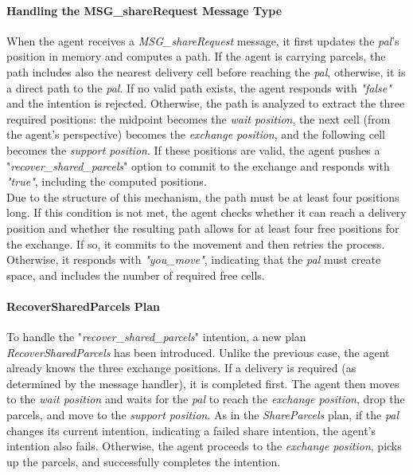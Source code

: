                 
                \paragraph{Handling the MSG\_shareRequest Message Type}
                    When the agent receives a \textit{MSG\_shareRequest} message, it first updates the \textit{pal}'s position in memory and computes a path. If the agent is carrying parcels, the path includes also the nearest delivery cell before reaching the \textit{pal}, otherwise, it is a direct path to the \textit{pal}. If no valid path exists, the agent responds with \textit{"false"} and the intention is rejected. Otherwise, the path is analyzed to extract the three required positions: the midpoint becomes the \textit{wait position}, the next cell (from the agent's perspective) becomes the \textit{exchange position}, and the following cell becomes the \textit{support position}. If these positions are valid, the agent pushes a "\textit{recover\_shared\_parcels}" option to commit to the exchange and responds with \textit{"true"}, including the computed positions.
                    \medskip\\
                    Due to the structure of this mechanism, the path must be at least four positions long. If this condition is not met, the agent checks whether it can reach a delivery position and whether the resulting path allows for at least four free positions for the exchange. If so, it commits to the movement and then retries the process. Otherwise, it responds with \textit{"you\_move"}, indicating that the \textit{pal} must create space, and includes the number of required free cells.
                    
                \paragraph{RecoverSharedParcels Plan}
                    To handle the "\textit{recover\_shared\_parcels}" intention, a new plan \textit{RecoverSharedParcels} has been introduced. Unlike the previous case, the agent already knows the three exchange positions. If a delivery is required (as determined by the message handler), it is completed first. The agent then moves to the \textit{wait position} and waits for the \textit{pal} to reach the \textit{exchange position}, drop the parcels, and move to the \textit{support position}. As in the \textit{ShareParcels} plan, if the \textit{pal} changes its current intention, indicating a failed share intention, the agent's intention also fails. Otherwise, the agent proceeds to the \textit{exchange position}, picks up the parcels, and successfully completes the intention.

